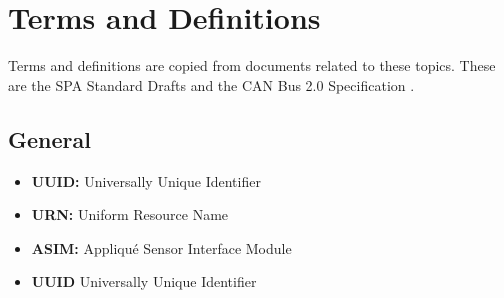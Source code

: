 \section{Terms and Definitions}
Terms and definitions are copied from documents related
to these topics. These are the SPA Standard Drafts
\cite{standard:spa_logical_interface,standard:spa_networking,
standard:spa_spacewire_adaptation,standard:spa_physical_interface,
standard:spa_local_adaptation} and the CAN Bus 2.0 Specification
\cite{standard:can_bus}.

\subsection{General}
\begin{itemize}
    \item \textbf{UUID:} Universally Unique Identifier
    \item \textbf{URN:} Uniform Resource Name
    \item \textbf{ASIM:} Appliqu\'{e} Sensor Interface Module
    \item \textbf{UUID} Universally Unique Identifier
\end{itemize}

